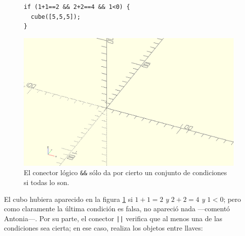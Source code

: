   \begin{figure}[ht]
\begin{minipage}[]{.6\textwidth}%
\begin{lstlisting}
if (1+1==2 && 2+2==4 && 1<0) {
  cube([5,5,5]);
}   
\end{lstlisting}
\end{minipage}
\begin{minipage}[]{.39\textwidth}%
  \centering
  \includegraphics[width=\textwidth]{imagenes/vacio}
  \end{minipage}
  \caption{El conector lógico \texttt{\&\&} sólo da por cierto un
    conjunto de condiciones si todas lo son.}
  \label{fig:if-y}
\end{figure}

\guillemotright El cubo hubiera aparecido en la figura \ref{fig:if-y}
si $1+1=2$ \emph{y} $2+2=4$ \emph{y} $1<0$; pero como claramente la
última condición es falsa, no apareció nada ---comentó Antonia---. Por
su parte, el conector \lstinline!||!  verifica que al menos una de las
condiciones sea cierta; en ese caso, realiza los objetos entre llaves:

